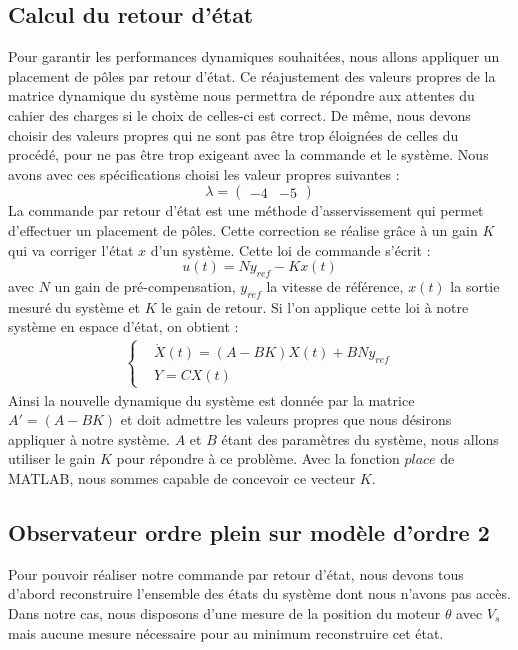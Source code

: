 \subsection{Calcul du retour d'état}
\label{sub:Calcul du retour etat}
Pour garantir les performances dynamiques souhaitées, nous allons appliquer un placement de pôles par retour d'état. Ce réajustement des valeurs propres de la matrice dynamique du système nous permettra de répondre aux attentes du cahier des charges si le choix de celles-ci est correct. De même, nous devons choisir des valeurs propres qui ne sont pas être trop éloignées de celles du procédé, pour ne pas être trop exigeant avec la commande et le système. Nous avons avec ces spécifications choisi les valeur propres suivantes :
\begin{equation}
\label{equation:valeurPropres}
\lambda = \begin{pmatrix}
-4 &-5
\end{pmatrix}
\end{equation}
La commande par retour d'état est une méthode d'asservissement qui permet d'effectuer un placement de pôles. Cette correction se réalise grâce à un gain $K$ qui va corriger l'état $x$ d'un système. Cette loi de commande s'écrit : 
\begin{equation}
u(t) = Ny_{ref}-Kx(t)
\end{equation} avec $N$ un gain de pré-compensation, $y_{ref}$ la vitesse de référence, $x(t)$ la sortie mesuré du système et $K$ le gain de retour. Si l'on applique cette loi à notre système en espace d'état, on obtient : 
\begin{align*}
\left\lbrace
\begin{aligned}
&\dot{X}(t) = (A-BK)X(t) + BNy_{ref}\\
&Y = CX(t)
\end{aligned}
\right.
\end{align*}
Ainsi la nouvelle dynamique du système est donnée par la matrice $A' = (A-BK)$ et doit admettre les valeurs propres que nous désirons appliquer à notre système. $A$ et $B$ étant des paramètres du système, nous allons utiliser le gain $K$ pour répondre à ce problème. Avec la fonction $place$ de MATLAB, nous sommes capable de concevoir ce vecteur $K$. 


\subsection{Observateur ordre plein sur modèle d'ordre 2\label{sub:constructionObeservateur}}
Pour pouvoir réaliser notre commande par retour d'état, nous devons tous d'abord reconstruire l'ensemble des états du système dont nous n'avons pas accès. Dans notre cas, nous disposons d'une mesure de la position du moteur $\theta$ avec $V_s$ mais aucune mesure nécessaire pour au minimum reconstruire cet état.


